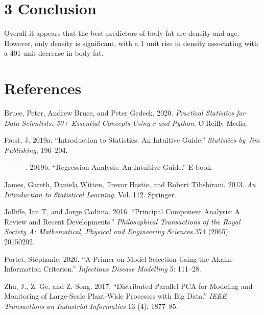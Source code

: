 \documentclass[
]{article}
\newlength{\cslhangindent}
\newlength{\cslentryspacingunit} %
\newenvironment{CSLReferences}[2] %
 {%
  \setlength{\parindent}{0pt}
  \ifodd #1
  \let\oldpar\par
  \def\par{\hangindent=\cslhangindent\oldpar}
  \fi
  \setlength{\parskip}{#2\cslentryspacingunit}
 }%
 {}
\begin{document}
\hypertarget{conclusion}{%
\section{\texorpdfstring{\textbf{3
Conclusion}}{3 Conclusion}}\label{conclusion}}

Overall it appears that the best predictors of body fat are density and
age. However, only density is significant, with a 1 unit rise in density
associating with a 401 unit decrease in body fat.

\hypertarget{references}{%
\section*{\texorpdfstring{\textbf{References}}{References}}\label{references}}

\hypertarget{refs}{}
\begin{CSLReferences}{1}{0}
\leavevmode{}%
Bruce, Peter, Andrew Bruce, and Peter Gedeck. 2020. \emph{Practical
Statistics for Data Scientists: 50+ Essential Concepts Using r and
Python}. O'Reilly Media.

\leavevmode{}%
Frost, J. 2019a. {``Introduction to Statistics: An Intuitive Guide.''}
\emph{Statistics by Jim Publishing}, 196--204.

\leavevmode{}%
---------. 2019b. {``Regression Analysis: An Intuitive Guide.''} E-book.

\leavevmode{}%
James, Gareth, Daniela Witten, Trevor Hastie, and Robert Tibshirani.
2013. \emph{An Introduction to Statistical Learning}. Vol. 112.
Springer.

\leavevmode{}%
Jolliffe, Ian T, and Jorge Cadima. 2016. {``Principal Component
Analysis: A Review and Recent Developments.''} \emph{Philosophical
Transactions of the Royal Society A: Mathematical, Physical and
Engineering Sciences} 374 (2065): 20150202.

\leavevmode{}%
Portet, Stéphanie. 2020. {``A Primer on Model Selection Using the Akaike
Information Criterion.''} \emph{Infectious Disease Modelling} 5:
111--28.

\leavevmode{}%
Zhu, J., Z. Ge, and Z. Song. 2017. {``Distributed Parallel PCA for
Modeling and Monitoring of Large-Scale Plant-Wide Processes with Big
Data.''} \emph{IEEE Transactions on Industrial Informatics} 13 (4):
1877--85.

\end{CSLReferences}
\end{document}
